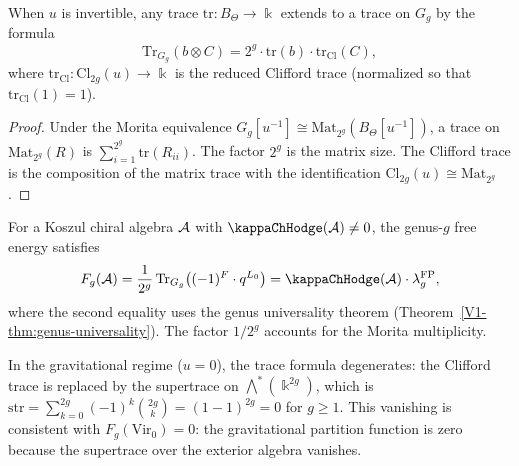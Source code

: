 \begin{proposition}
When $u$ is invertible, any trace $\mathrm{tr}\colon B_\Theta \to \Bbbk$
extends to a trace on $G_g$ by the formula
\begin{equation}%
\mathrm{Tr}_{G_g}(b \otimes C) =
2^g \cdot \mathrm{tr}(b) \cdot \mathrm{tr}_{\mathrm{Cl}}(C),
\end{equation}
where $\mathrm{tr}_{\mathrm{Cl}}\colon \mathrm{Cl}_{2g}(u)
\to \Bbbk$ is the reduced Clifford trace (normalized so that
$\mathrm{tr}_{\mathrm{Cl}}(1) = 1$).
\end{proposition}

\begin{proof}
Under the Morita equivalence
$G_g[u^{-1}] \cong \mathrm{Mat}_{2^g}(B_\Theta[u^{-1}])$, a trace on
$\mathrm{Mat}_{2^g}(R)$ is $\sum_{i=1}^{2^g}\mathrm{tr}(R_{ii})$.
The factor $2^g$ is the matrix size. The Clifford trace is the
composition of the matrix trace with the identification
$\mathrm{Cl}_{2g}(u) \cong \mathrm{Mat}_{2^g}$.
\end{proof}

\begin{corollary}
For a Koszul chiral algebra $\mathcal{A}$ with $\kappaChHodge(\cA) \neq 0$, the
genus-$g$ free energy satisfies
\begin{equation}%
F_g(\cA) = \frac{1}{2^g}\,\mathrm{Tr}_{G_g}\bigl(
(-1)^F \cdot q^{L_0}\bigr)
= \kappaChHodge(\cA) \cdot \lambda_g^{\mathrm{FP}},
\end{equation}
where the second equality uses the genus universality theorem
(Theorem~\ref{V1-thm:genus-universality}). The factor $1/2^g$ accounts
for the Morita multiplicity.
\end{corollary}

\begin{remark}[The partition function at $u = 0$]
In the gravitational regime ($u = 0$), the trace formula degenerates:
the Clifford trace is replaced by the supertrace on
$\bigwedge^*(\Bbbk^{2g})$, which is
$\mathrm{str} = \sum_{k=0}^{2g}(-1)^k\binom{2g}{k} =
(1-1)^{2g} = 0$ for $g \geq 1$. This vanishing is consistent with
$F_g(\mathrm{Vir}_0) = 0$: the gravitational partition function is
zero because the supertrace over the exterior algebra vanishes.
\end{remark}

